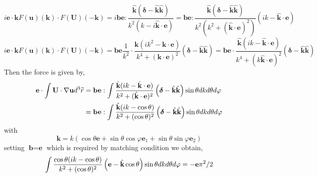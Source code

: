 \begin{equation}
    i \textbf{e}\cdot \textbf{k}F( \textbf{u})(\textbf{k})
    \cdot F(\textbf{U})(-\textbf{k})
    =
    i \textbf{be} :
    \frac{\hat{\textbf{k} }(\bm\delta - \hat{\textbf{k}}\hat{\textbf{k}})}{k^2(k - i\hat{\textbf{k}}\cdot \textbf{e})}
    =
    \textbf{be} :
    \frac{\hat{\textbf{k} }(\bm\delta - \hat{\textbf{k}}\hat{\textbf{k}})}{k^2(k^2 + (\hat{\textbf{k}}\cdot \textbf{e})^2)}(ik - \hat{\textbf{k}}\cdot \textbf{e})
\end{equation}
\begin{equation}
    i \textbf{e}\cdot \textbf{k}F( \textbf{u})(\textbf{k})
    \cdot F(\textbf{U})(-\textbf{k})
    =
     \textbf{be} \frac{1}{k^2}
    \cdot  \frac{\textbf{k} (ik^2 - \textbf{k}\cdot \textbf{e})}{k^4 + (\textbf{k}\cdot \textbf{e})^2} \left(\bm\delta - \hat{\textbf{k}}\hat{\textbf{k}}\right)
    =
    \textbf{be}
   \cdot  \frac{\hat{\textbf{k}} (ik - \hat{\textbf{k}}\cdot \textbf{e})}{k^4 + (k\hat{\textbf{k}}\cdot \textbf{e})^2} \left(\bm\delta - \hat{\textbf{k}}\hat{\textbf{k}}\right)
\end{equation}
Then the force is given by,
\begin{align}
    \textbf{e}\cdot \int \textbf{U}\cdot \mathbf{\nabla} \textbf{u} d^3 \widetilde{r}
    &=
    \textbf{be}
    :
    \int \frac{\hat{\textbf{k}} (ik - \hat{\textbf{k}}\cdot \textbf{e})}{k^2 + (\hat{\textbf{k}}\cdot \textbf{e})^2} \left(\bm\delta - \hat{\textbf{k}}\hat{\textbf{k}}\right) \sin\theta dkd\theta d\varphi\\
    &=
    \textbf{be}
    :
    \int \frac{\hat{\textbf{k}}  (ik - \cos\theta)}{k^2 + (\cos\theta)^2} \left(\bm\delta - \hat{\textbf{k}} \hat{\textbf{k}}\right) \sin\theta dkd\theta d\varphi\\
\end{align}
with
\begin{equation}
    \textbf{k} = k(
        \cos\theta \textbf{e}
        + \sin\theta\cos\varphi \textbf{e}_1
        + \sin\theta\sin\varphi \textbf{e}_2
    )
\end{equation}
setting $\textbf{b}=\textbf{e}$ which is required by matching condition we obtain,
\begin{equation}
    \int \frac{\cos\theta (ik - \cos\theta)}{k^2 + (\cos\theta)^2} \left(\textbf{e} - \hat{\textbf{k}} \cos\theta \right) \sin\theta dkd\theta d\varphi
    =- \textbf{e} \pi^2 /2\\
\end{equation}
